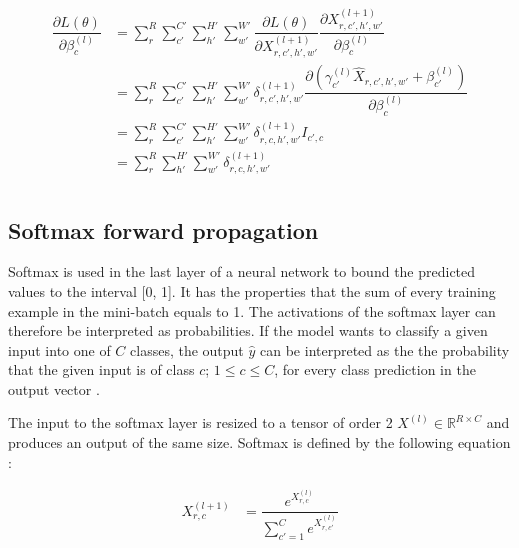 \documentclass[a4paper, twoside]{article}
\newcommand*{\pd}[2]{\ensuremath{\dfrac{\partial #1}{\partial #2}}}
\begin{document}
\begin{align}
\begin{split}
	\pd{L(\theta)}{\beta^{(l)}_{c}}
		& = \sum^{R }_{r} \sum^{C' }_{c'} \sum^{H' }_{h'} \sum^{W' }_{w'} \pd{L(\theta)}{X^{(l+1)}_{r,c',h',w'}} \pd{X^{(l+1)}_{r,c',h',w'}}{\beta^{(l)}_{c}} \\
		& = \sum^{R }_{r} \sum^{C' }_{c'} \sum^{H' }_{h'} \sum^{W' }_{w'} \delta^{(l+1)}_{r,c',h',w'}  \pd{({\gamma_{c'}^{(l)} \hat{X}_{r,c',h',w'} + \beta_{c'}^{(l)}})}{\beta^{(l)}_{c}} \\
		& = \sum^{R }_{r} \sum^{C' }_{c'} \sum^{H' }_{h'} \sum^{W' }_{w'} \delta^{(l+1)}_{r,c,h',w'} I_{c',c}\\
		& = \sum^{R }_{r} \sum^{H' }_{h'} \sum^{W' }_{w'} \delta^{(l+1)}_{r,c,h',w'} \\
\end{split}
\end{align}

\subsection{Softmax forward propagation}
Softmax is used in the last layer of a neural network to bound the predicted values to the interval [0, 1]. It has the properties that the sum of every training example in the mini-batch equals to 1. The activations of the softmax layer can therefore be interpreted as probabilities. If the model wants to classify a given input into one of $C$ classes, the output $\hat{y}$ can be interpreted as the the probability that the given input is of class $c$; $1 \leq c \leq C$, for every class prediction in the output vector \cite{cs231n}.

The input to the softmax layer is resized to a tensor of order 2 $X^{(l)} \in \mathbb{R}^{R \times C}$ and produces an output of the same size. Softmax is defined by the following equation \cite{cs231n}:

\begin{equation}\label{softmax}
\begin{split}
X^{(l+1)}_{r,c}
	& = \dfrac{e^{X^{(l)}_{r,c}}}{\sum^{C }_{c'=1}e^{X^{(l)}_{r,c'}}} \\
\end{split}
\end{equation}
\end{document}
